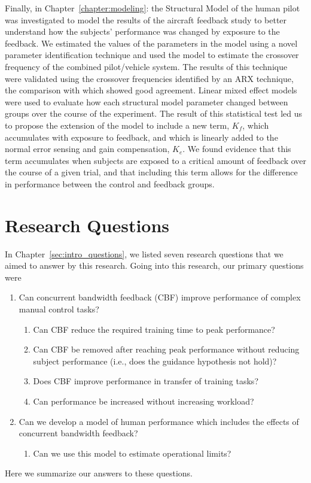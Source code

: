 Finally, in Chapter~\ref{chapter:modeling}:  the Structural Model of the human pilot was investigated to model the results of the aircraft feedback study to better understand how the subjects' performance was changed by exposure to the feedback.
We estimated the values of the parameters in the model using a novel parameter identification technique and used the model to estimate the crossover frequency of the combined pilot/vehicle system.
The results of this technique were validated using the crossover frequencies identified by an ARX technique, the comparison with which showed good agreement.
Linear mixed effect models were used to evaluate how each structural model parameter changed between groups over the course of the experiment.
The result of this statistical test led us to propose the extension of the model to include a new term, $K_f$, which accumulates with exposure to feedback, and which is linearly added to the normal error sensing and gain compensation, $K_e$.
We found evidence that this term accumulates when subjects are exposed to a critical amount of feedback over the course of a given trial, and that including this term allows for the difference in performance between the control and feedback groups.

\section{Research Questions}

In Chapter~\ref{sec:intro_questions}, we listed seven research questions that we aimed to answer by this research.
Going into this research, our primary questions were
\begin{enumerate}
    \item Can concurrent bandwidth feedback (CBF) improve performance of complex manual control tasks?
          \begin{enumerate}
              \item Can CBF reduce the required training time to peak performance?
              \item Can CBF be removed after reaching peak performance without reducing subject performance (i.e., does the guidance hypothesis not hold)?
              \item Does CBF improve performance in transfer of training tasks?
              \item Can performance be increased without increasing workload?
          \end{enumerate}
    \item Can we develop a model of human performance which includes the effects of concurrent bandwidth feedback?
          \begin{enumerate}
              \item Can we use this model to estimate operational limits?
          \end{enumerate}
\end{enumerate}
Here we summarize our answers to these questions.

